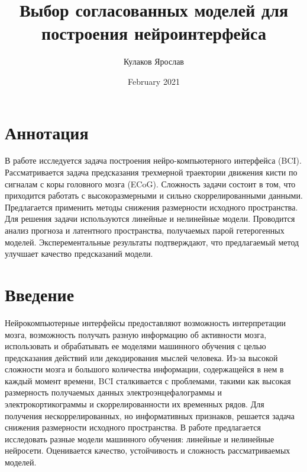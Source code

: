 \documentclass{article}
\title{Выбор согласованных моделей для построения нейроинтерфейса}
\author{Кулаков Ярослав}
\date{February 2021}
\begin{document}
\maketitle




\section{Аннотация}
В работе исследуется задача построения нейро-компьютерного интерфейса (BCI). Рассматривается задача предсказания трехмерной траектории движения кисти по сигналам с коры головного мозга (ECoG). Сложность задачи состоит в том, что приходится работать с высокоразмерными и сильно скоррелированными данными. Предлагается применить методы снижения размерности исходного пространства. Для решения задачи используются линейные и нелинейные модели. Проводится анализ прогноза и латентного пространства, получаемых парой гетерогенных моделей. Эксперементальные результаты подтверждают, что предлагаемый метод улучшает качество предсказаний модели.

\section{Введение}
Нейрокомпьютерные интерфейсы предоставляют возможность интерпретации мозга, возможность получать разную информацию об активности мозга, использовать и обрабатывать ее моделями машинного обучения с целью предсказания действий или декодирования мыслей человека. Из-за высокой сложности мозга и большого количества информации, содержащейся в нем в каждый момент времени, BCI сталкивается с проблемами, такими как высокая размерность получаемых данных электроэнцефалограммы и электрокортикограммы и скоррелированности их временных рядов. Для получения нескоррелированных, но информативных признаков, решается задача снижения размерности исходного пространства.\cite{feature_selection_ecog}
В работе предлагается исследовать разные модели машинного обучения: линейные и нелинейные нейросети. Оценивается качество, устойчивость и сложность рассматриваемых моделей.  \par
\end{document}
